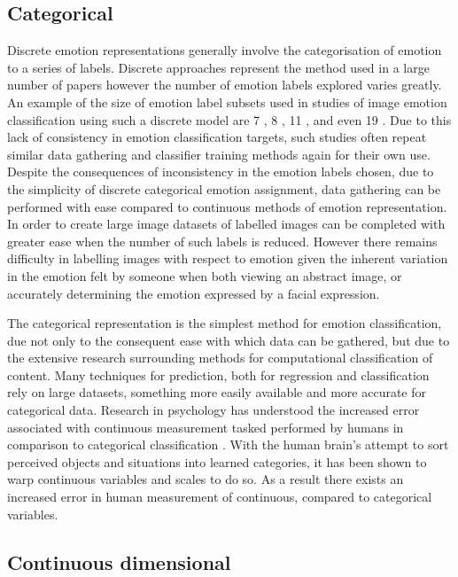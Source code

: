 \documentclass{article}
\begin{document}
\subsection{Categorical}

Discrete emotion representations generally involve the categorisation of emotion to a series of labels.
Discrete approaches represent the method used in a large number of papers \citep{machajdik2010affective,ali2017emotional,wangarttalk,mohammad2018wikiart} however the number of emotion labels explored varies greatly.
An example of the size of emotion label subsets used in studies of image emotion classification using such a discrete model are 7 \citep{ali2017emotional}, 8 \citep{machajdik2010affective}, 11 \citep{wangarttalk}, and even 19 \citep{mohammad2018wikiart}.
Due to this lack of consistency in emotion classification targets, such studies often repeat similar data gathering and classifier training methods again for their own use.
Despite the consequences of inconsistency in the emotion labels chosen, due to the simplicity of discrete categorical emotion assignment, data gathering can be performed with ease compared to continuous methods of emotion representation.
In order to create large image datasets of labelled images can be completed with greater ease when the number of such labels is reduced.
However there remains difficulty in labelling images with respect to emotion given the inherent variation in the emotion felt by someone when both viewing an abstract image, or accurately determining the emotion expressed by a facial expression.

The categorical representation is the simplest method for emotion classification, due not only to the consequent ease with which data can be gathered, but due to the extensive research surrounding methods for computational classification of content.
Many techniques for prediction, both for regression and classification rely on large datasets, something more easily available and more accurate for categorical data.
Research in psychology has understood the increased error associated with continuous measurement tasked performed by humans in comparison to categorical classification \citep{harnad2003categorical}.
With the human brain's attempt to sort perceived objects and situations into learned categories, it has been shown to warp continuous variables and scales to do so.
As a result there exists an increased error in human measurement of continuous, compared to categorical variables.


\subsection{Continuous dimensional}
\end{document}
